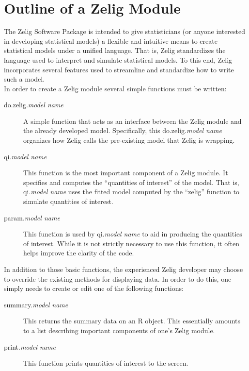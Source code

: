 \section{Outline of a Zelig Module}

The Zelig Software Package is intended to give statisticians (or anyone interested in developing statistical models) a flexible and intuitive means to create statistical models under a unified language.  That is, Zelig standardizes the language used to interpret and simulate statistical models.  To this end, Zelig incorporates several features used to streamline and standardize how to write such a model.\\

In order to create a Zelig module several simple functions must be written:

\begin{description}
	\item[do.zelig.\emph{model name}]{A simple function that acts as an interface between the Zelig module and the already developed model.  Specifically, this do.zelig.\emph{model name} organizes how Zelig calls the pre-existing model that Zelig is wrapping.}
	\item[qi.\emph{model name}]{This function is the most important component of a Zelig module.  It specifies and computes the ``quantities of interest'' of the model.  That is, qi.\emph{model name} uses the fitted model computed by the ``zelig'' function to simulate quantities of interest.}
	\item[param.\emph{model name}]{This function is used by qi.\emph{model name} to aid in producing the quantities of interest.  While it is not strictly necessary to use this function, it often helps improve the clarity of the code.}
\end{description}

In addition to those basic functions, the experienced Zelig developer may choose to override the existing methods for displaying data.  In order to do this, one simply needs to create or edit one of the following functions:

\begin{description}
	\item[summary.\emph{model name}]{This returns the summary data on an R object.  This essentially amounts to a list describing important components of one's Zelig module.}
	\item[print.\emph{model name}]{This function prints quantities of interest to the screen.}
\end{description}

